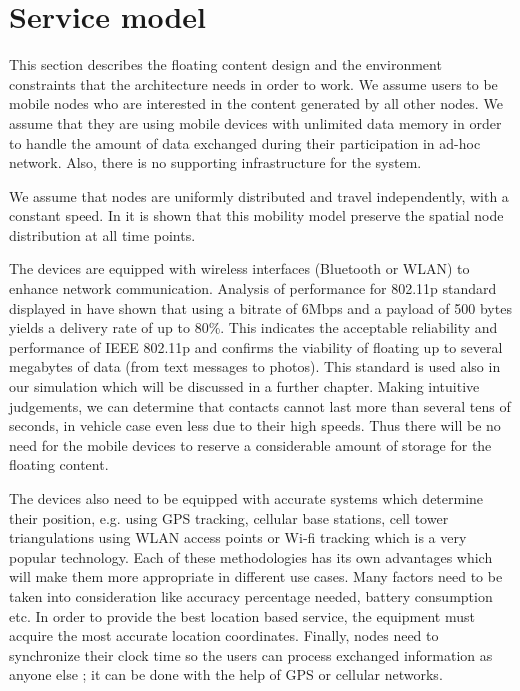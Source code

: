 \section{Service model}

This section describes the floating content design and the environment
constraints that the architecture needs in order to work. We assume users to be
mobile nodes who are interested in the content generated by all other nodes. We
assume that they are using mobile devices with unlimited data memory in order to
handle the amount of data exchanged during their participation in ad-hoc
network. Also, there is no supporting infrastructure for the system.

We assume that nodes are uniformly distributed and travel independently, with a
constant speed. In \cite{uniform_distribution} it is shown that this mobility
model preserve the spatial node distribution at all time points.

The devices are equipped with wireless interfaces (Bluetooth or WLAN) to enhance
network communication. Analysis of performance for 802.11p standard displayed in
\cite {performance80211} have shown that using a bitrate of 6Mbps and a
payload of 500 bytes yields a delivery rate of up to 80\%. This indicates the
acceptable reliability and performance of IEEE 802.11p and confirms the
viability of floating up to several megabytes of data (from text messages to
photos). This standard is used also in our simulation which will be discussed in
a further chapter. Making intuitive judgements, we can determine that contacts
cannot last more than several tens of seconds, in vehicle case even less due to
their high speeds. Thus there will be no need for the mobile devices to reserve
a considerable amount of storage for the floating content.

The devices also need to be equipped with accurate systems which determine their
position, e.g. using GPS tracking, cellular base stations, cell tower
triangulations using WLAN access points or Wi-fi tracking which is a very
popular technology. Each of these methodologies has its own advantages which
will make them more appropriate in different use cases. Many factors
need to be taken into consideration like accuracy percentage needed, battery
consumption etc. In order to provide the best location based service, the
equipment must acquire the most accurate location coordinates. Finally,
nodes need to synchronize their clock time so the users can process exchanged
information as anyone else ; it can be done with the help of GPS or cellular
networks.


